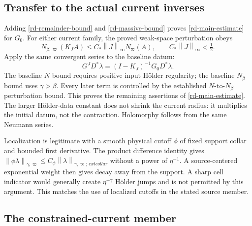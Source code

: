 \documentclass[11pt]{article}
\theoremstyle{remark}
\newcommand{\norm}[1]{\left\|#1\right\|}
\begin{document}
\subsection{Transfer to the actual current inverses}

Adding \eqref{rd-remainder-bound} and \eqref{rd-massive-bound}
proves \eqref{rd-main-estimate} for $G_0$. For either current
family, the proved weak-space perturbation obeys
\[
 N_{\beta,\varpi}(K_JA)
       \le C_*\norm{J}_\infty N_\varpi(A),\qquad
 C_*\norm{J}_\infty<\tfrac12.
\]
Apply the same convergent series to the baseline datum:
\begin{equation}\label{rd-current-transfer}
 G^JD^*\lambda=(I-K_J)^{-1}G_0D^*\lambda.
\end{equation}
The baseline $N$ bound requires positive input H\"older regularity;
the baseline $N_\beta$ bound uses $\gamma>\beta$. Every later term
is controlled by the established $N$-to-$N_\beta$ perturbation
bound. This proves the remaining assertions of
\eqref{rd-main-estimate}. The larger H\"older-data constant does
not shrink the current radius: it multiplies the initial datum,
not the contraction. Holomorphy follows from the same Neumann series.

Localization is legitimate with a smooth physical cutoff $\phi$
of fixed support collar and bounded first derivative. The product
difference identity gives
$\norm{\phi\lambda}_{\gamma,\varpi}
 \le C_\phi\norm{\lambda}_{\gamma,\varpi;\,	ext{collar}}$
without a power of $\eta^{-1}$. A source-centered exponential weight
then gives decay away from the support. A sharp cell indicator
would generally create $\eta^{-\gamma}$ H\"older jumps and is not
permitted by this argument. This matches the use of localized
cutoffs in the stated source member.

\subsection{The constrained-current member}
\end{document}
